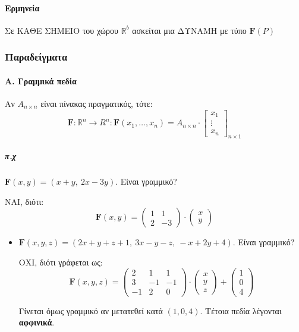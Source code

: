 \documentclass[11pt,a4paper,titlepage,draft]{article}
\begin{document}
\paragraph{Ερμηνεία} Σε ΚΑΘΕ ΣΗΜΕΙΟ του χώρου $\mathbb R^b$ ασκείται μια ΔΥΝΑΜΗ με τύπο $
\mathbf F(P)
$

\subsubsection{Παραδείγματα}
\paragraph{Α. Γραμμικά πεδία}
Αν $A_{n \times n}$ είναι πίνακας πραγματικός, τότε:
\[
\mathbf{F} : \mathbb R^n \to R^n: \mathbf F(x_1,\dots,x_n) = A_{n \times n} \cdot \left[
\begin{matrix}
x_1 \\ \vdots \\ x_n
\end{matrix}
\right]_{n\times 1}
\]
\subparagraph{π.χ} \(
\mathbf F(x,y)=(x+y,\ 2x-3y)
\). Είναι γραμμικό?

ΝΑΙ, διότι:
\[
\mathbf F(x,y) = \left(
\begin{matrix}
1&1\\2&-3
\end{matrix} \right) \cdot \left( \begin{matrix}
x\\y
\end{matrix}
\right)
\]


\begin{itemize}
\item \(\mathbf F(x,y,z) = (2x+y+z+1,\ 3x-y-z,\ -x+2y+4) \). Είναι γραμμικό?

ΟΧΙ, διότι γράφεται ως:
\[
\mathbf F(x,y,z) = \left(
\begin{matrix}
2&1&1 \\ 3 & -1 & -1 \\
-1 & 2 & 0
\end{matrix}
\right) \cdot \left(
\begin{matrix}
x\\y\\z
\end{matrix}
\right) + \left(
\begin{matrix}
1 \\ 0 \\ 4
\end{matrix}
\right)
\]

Γίνεται όμως γραμμικό αν μετατεθεί κατά $(1,0,4)$. Τέτοια πεδία λέγονται \textbf{αφφινικά}.
\end{itemize}
\end{document}
